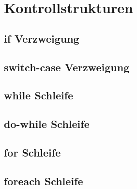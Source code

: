 



\section{Kontrollstrukturen}

\subsection{if Verzweigung}

\subsection{switch-case Verzweigung}


\subsection{while Schleife}


\subsection{do-while Schleife}


\subsection{for Schleife}


\subsection{foreach Schleife}

